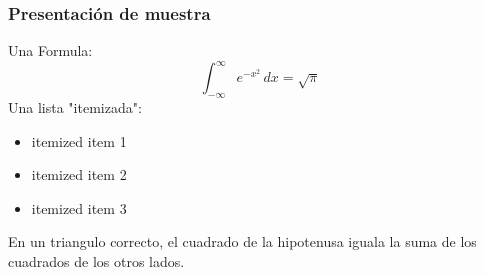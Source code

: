 \documentclass{beamer}					%
\begin{document}
	\begin{frame}
		\frametitle{Presentación de muestra}
		Una Formula:
		\[
		\int_{-\infty}^\infty e^{-x^2} \, dx = \sqrt{\pi}
		\]
		Una lista "itemizada":
		\begin{itemize}
			\item itemized item 1
			\item itemized item 2
			\item itemized item 3
		\end{itemize}		
		\begin{theorem}
			En un triangulo correcto, el cuadrado de la hipotenusa
			iguala la suma de los cuadrados de los otros lados.
		\end{theorem}
	\end{frame}
\end{document}
